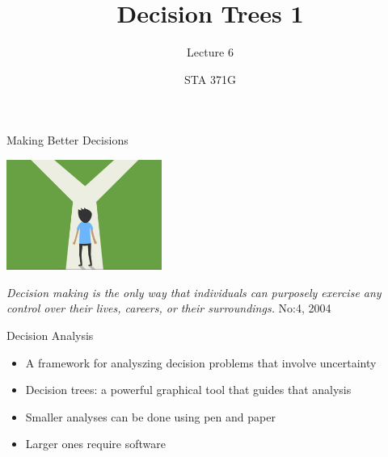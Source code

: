 \documentclass{beamer}\usepackage[]{graphicx}\usepackage[]{color}
\title{Decision Trees 1}
\subtitle{Lecture 6}
\author{STA 371G}
\begin{document}
  
  

  \frame{\maketitle}



  \begin{darkframes}

    \begin{frame}{Making Better Decisions}
      \fontsize{10}{10}\selectfont
      \begin{center}
        \includegraphics[width=2in]{DecisionAnalysis.png} \\
      \end{center}
        \textit{Decision making is the only way that individuals can purposely
        exercise any control over their lives, careers, or their surroundings.}
        No:4, 2004

      \lc %
    \end{frame}


    \begin{frame}[fragile]{Decision Analysis}
      \begin{itemize}[<+->]
        \item A framework for analyszing decision problems that involve uncertainty
        \item Decision trees: a powerful graphical tool that guides that analysis
        \item Smaller analyses can be done using pen and paper
        \item Larger ones require software
        \end{itemize}
    \end{frame}



\end{darkframes}
\end{document}
